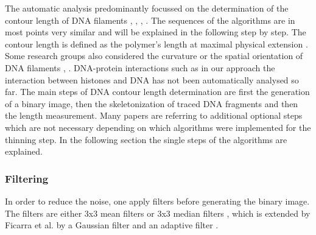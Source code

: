 \documentclass{article}
\begin{document}
The automatic analysis predominantly focussed on the determination of the contour length of DNA filaments \cite{spisz1998automated}, \cite{sanchez2002accuracy}, \cite{sundstrom2012image}, \cite{marturelliautomated}. The sequences of the algorithms are in most points very similar and will be explained in the following step by step. The contour length is defined as the polymer’s length at maximal physical extension \cite{rivetti2001accurate}.  Some research groups also considered the curvature or the spatial orientation of DNA filaments \cite{ficarra2005automated}, \cite{ficarra2005automatic}. DNA-protein interactions such as in our approach the interaction between histones and DNA has not been automatically analysed so far. 
The main steps of DNA contour length determination are first the generation of a binary image, then the skeletonization of traced DNA fragments and then the length measurement. Many papers are referring to additional optional steps which are not necessary depending on which algorithms were implemented for the thinning step. In the following section the single steps of the algorithms are explained. 

\subsubsection{Filtering}
In order to reduce the noise, one apply filters before generating the binary image. The filters are either 3x3 mean filters \cite{rigotti2005quantitative} or 3x3 median filters \cite{ficarra2005automatic}, \cite{ficarra2002automated} which is extended by Ficarra et al. by a Gaussian filter and an adaptive filter \cite{ficarra2005automated}. 
\end{document}
